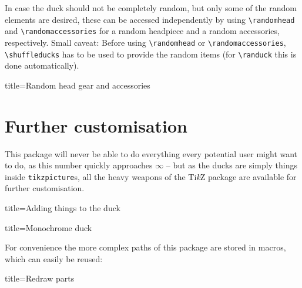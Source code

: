 \documentclass[parskip=half]{scrartcl}
\newcommand{\TikZ}{Ti\emph{k}Z\xspace}
\begin{document}
In case the duck should not be completely random, but only some of the random elements are desired, these can be accessed independently by using \lstinline|\randomhead| and \lstinline|\randomaccessories| for a random headpiece and a random accessories, respectively. Small caveat: Before using \lstinline|\randomhead| or \lstinline|\randomaccessories|, \lstinline|\shuffleducks| has to be used to provide the random items (for \lstinline|\randuck| this is done automatically).     

\begin{tcblisting}{title={Random head gear and accessories}}
\begin{tikzpicture}
	\shuffleducks
	\duck[\randomhead, \randomaccessories]
\end{tikzpicture}
\end{tcblisting}

\section{Further customisation}

This package will never be able to do everything every potential user might want to do, as this number quickly approaches $\infty$ -- but as the ducks are simply things inside \lstinline|tikzpicture|s, all the heavy weapons of the \TikZ package are available for further customisation.

\begin{tcblisting}{title={Adding things to the duck}}
\end{tcblisting}

\begin{tcblisting}{title={Monochrome duck}}
\end{tcblisting}

For convenience the more complex paths of this package are stored in macros, which can easily be reused:

\begin{tcblisting}{title={Redraw parts}}
\begin{tikzpicture}
	\duck
	\path[preaction={fill, red!50!black},pattern=fivepointed stars, pattern color=yellow]  
			\duckpathlonghair;
\end{tikzpicture}
\end{tcblisting}
\end{document}
